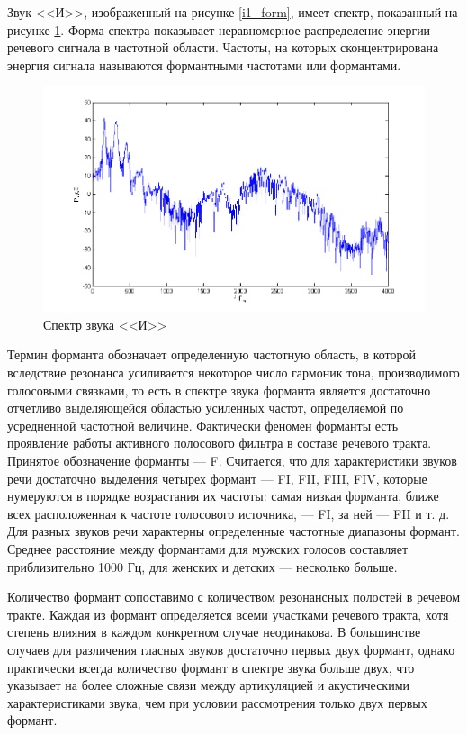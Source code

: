 \documentclass[a4paper,14pt,russian,utf8,nocolumnsxix,nocolumnxxxi,nocolumnxxxii]{eskdtext}
\begin{document}
Звук <<И>>, изображенный на рисунке \ref{i1_form}, имеет спектр, показанный на рисунке \ref{i1_spect}. Форма спектра показывает неравномерное распределение энергии речевого сигнала в частотной области. Частоты, на которых сконцентрирована энергия сигнала называются формантными частотами или формантами.
\begin{figure}[H]	
	\centering
	\includegraphics[width=120mm]{i1_spect.png}			
	\caption{Спектр звука <<И>>}
	\label{i1_spect}
\end{figure}

Термин форманта обозначает определенную частотную область, в которой вследствие резонанса усиливается некоторое число гармоник тона, производимого голосовыми связками, то есть в спектре звука форманта является достаточно отчетливо выделяющейся областью усиленных частот, определяемой по усредненной частотной величине. Фактически феномен форманты есть проявление работы активного полосового фильтра в составе речевого тракта. Принятое обозначение форманты --- F. Считается, что для характеристики звуков речи достаточно выделения четырех формант --- FI, FII, FIII, FIV, которые нумеруются в порядке возрастания их частоты: самая низкая форманта, ближе всех расположенная к частоте голосового источника, --- FI, за ней --- FII и т. д. Для разных звуков речи характерны определенные частотные диапазоны формант. Среднее расстояние между формантами для мужских голосов составляет приблизительно 1000 Гц, для женских и детских --- несколько больше.\cite{bondarko}

Количество формант сопоставимо с количеством резонансных полостей в речевом тракте. Каждая из формант определяется всеми участками речевого тракта, хотя степень влияния в каждом конкретном случае неодинакова. В большинстве случаев для различения гласных звуков достаточно первых двух формант, однако практически всегда количество формант в спектре звука больше двух, что указывает на более сложные связи между артикуляцией и акустическими характеристиками звука, чем при условии рассмотрения только двух первых формант.
\end{document}
